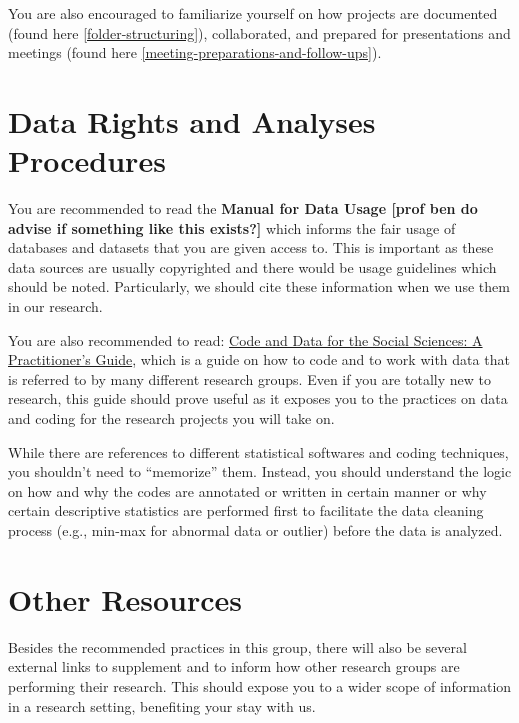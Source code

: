 \documentclass[
]{book}
\begin{document}
You are also encouraged to familiarize yourself on how projects are documented (found here \ref{folder-structuring}), collaborated, and prepared for presentations and meetings (found here \ref{meeting-preparations-and-follow-ups}).

\hypertarget{data-rights-and-analyses-procedures}{%
\section{Data Rights and Analyses Procedures}\label{data-rights-and-analyses-procedures}}

You are recommended to read the \textbf{Manual for Data Usage {[}prof ben do advise if something like this exists?{]}} which informs the fair usage of databases and datasets that you are given access to. This is important as these data sources are usually copyrighted and there would be usage guidelines which should be noted. Particularly, we should cite these information when we use them in our research.

You are also recommended to read: \href{https://web.stanford.edu/~gentzkow/research/CodeAndData.pdf}{Code and Data for the Social Sciences: A Practitioner's Guide}, which is a guide on how to code and to work with data that is referred to by many different research groups. Even if you are totally new to research, this guide should prove useful as it exposes you to the practices on data and coding for the research projects you will take on.

While there are references to different statistical softwares and coding techniques, you shouldn't need to ``memorize'' them. Instead, you should understand the logic on how and why the codes are annotated or written in certain manner or why certain descriptive statistics are performed first to facilitate the data cleaning process (e.g., min-max for abnormal data or outlier) before the data is analyzed.

\hypertarget{other-resources}{%
\section{Other Resources}\label{other-resources}}

Besides the recommended practices in this group, there will also be several external links to supplement and to inform how other research groups are performing their research. This should expose you to a wider scope of information in a research setting, benefiting your stay with us.
\end{document}
